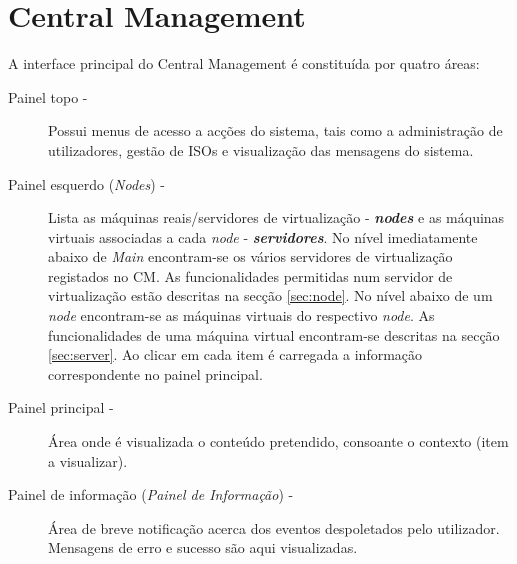 
\chapter{\textsf{Central Management}}

A interface principal do Central Management é constituída por quatro áreas:

\begin{description}
	\item[Painel topo -] Possui menus de acesso a acções do sistema, tais como a administração de utilizadores, gestão de ISOs e visualização das mensagens do sistema.
	\item[Painel esquerdo (\emph{Nodes}) -] Lista as máquinas reais/servidores de virtualização - {\bf\emph{nodes}} e as máquinas virtuais associadas a cada \emph{node} - {\bf\emph{servidores}}. No nível imediatamente abaixo de \emph{Main} encontram-se os vários servidores de virtualização registados no CM. As funcionalidades permitidas num servidor de virtualização estão descritas na secção \ref{sec:node}. No nível abaixo de um \emph{node} encontram-se as máquinas virtuais do respectivo \emph{node}. As funcionalidades de uma máquina virtual encontram-se descritas na secção \ref{sec:server}. Ao clicar em cada item é carregada a informação correspondente no painel principal.
	\item[Painel principal -] Área onde é visualizada o conteúdo pretendido, consoante o contexto (item a visualizar).
	\item[Painel de informação (\emph{Painel de Informação}) -] Área de breve notificação acerca dos eventos despoletados pelo utilizador. Mensagens de erro e sucesso são aqui visualizadas.
\end{description}

